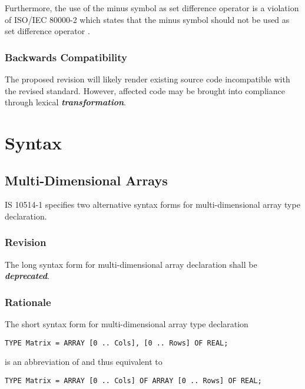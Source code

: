 \documentclass[10pt,a4paper,leqno,fleqn]{article}
\renewcommand{\emph}[1]{\textbf{\textit{#1}}}
\begin{document}
\noindent Furthermore, the use of the minus symbol as set difference operator
is a violation of ISO/IEC 80000-2 which states that the minus symbol
should not be used as set difference operator \cite{II2019}.

\subsubsection{Backwards Compatibility}

The proposed revision will likely render existing source code incompatible with
the revised standard. However, affected code may be brought into compliance
through lexical \emph{transformation}.


\section{Syntax}

\subsection{Multi-Dimensional Arrays}

IS 10514-1 specifies two alternative syntax forms for multi-dimensional
array type declaration.

\subsubsection{Revision}

The long syntax form for multi-dimensional array declaration shall be
\emph{deprecated}.

\subsubsection{Rationale}

The short syntax form for multi-dimensional array type declaration

\lstset{style=modula2}
\begin{lstlisting}
TYPE Matrix = ARRAY [0 .. Cols], [0 .. Rows] OF REAL;
\end{lstlisting}

\noindent is an abbreviation of and thus equivalent to 
\lstset{style=modula2}
\begin{lstlisting}
TYPE Matrix = ARRAY [0 .. Cols] OF ARRAY [0 .. Rows] OF REAL;
\end{lstlisting}
\end{document}
